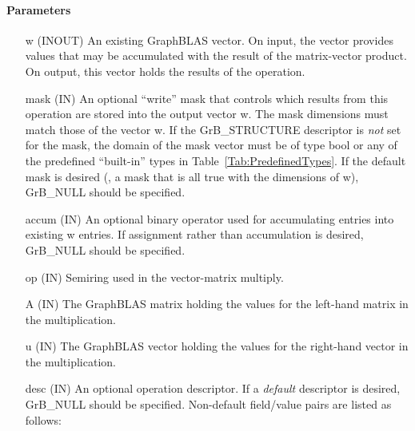 \paragraph{Parameters}

\begin{itemize}[leftmargin=1.1in]
    \item[{\sf w}]    ({\sf INOUT}) An existing GraphBLAS vector.  On input,
    the vector provides values that may be accumulated with the result of the
    matrix-vector product.  On output, this vector holds the results of the
    operation.

    \item[{\sf mask}] ({\sf IN}) An optional ``write'' mask that controls which
    results from this operation are stored into the output vector {\sf w}. The 
    mask dimensions must match those of the vector {\sf w}. If the 
    {\sf GrB\_STRUCTURE} descriptor is {\em not} set for the mask, the domain of the
    {\sf mask} vector must be of type {\sf bool} or any of the predefined 
    ``built-in'' types in Table~\ref{Tab:PredefinedTypes}.  If the default
    mask is desired (\ie, a mask that is all {\sf true} with the dimensions of {\sf w}), 
    {\sf GrB\_NULL} should be specified.

    \item[{\sf accum}] ({\sf IN}) An optional binary operator used for accumulating
    entries into existing {\sf w} entries.
    If assignment rather than accumulation is
    desired, {\sf GrB\_NULL} should be specified.

    \item[{\sf op}]   ({\sf IN}) Semiring used in the vector-matrix
    multiply.

    \item[{\sf A}]    ({\sf IN}) The GraphBLAS matrix holding the values
    for the left-hand matrix in the multiplication.

    \item[{\sf u}]    ({\sf IN}) The GraphBLAS vector holding the values for
    the right-hand vector in the multiplication.

    \item[{\sf desc}] ({\sf IN}) An optional operation descriptor. If
    a \emph{default} descriptor is desired, {\sf GrB\_NULL} should be
    specified. Non-default field/value pairs are listed as follows:  \\


\end{itemize}
